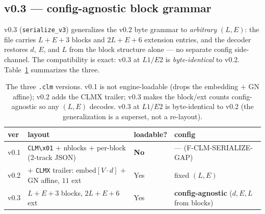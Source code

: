 \subsection{v0.3 --- config-agnostic block grammar}
\label{app:clm-v03}

v0.3 (\texttt{serialize\_v3}) generalizes the v0.2 byte grammar to \emph{arbitrary}
$(L,E)$: the file carries $L+E+3$ blocks and $2L+E+6$ extension entries, and the
decoder restores $d$, $E$, and $L$ from the block structure alone --- no separate
config side-channel. The compatibility is exact: v0.3 at $L1/E2$ is
\emph{byte-identical} to v0.2. Table~\ref{tab:clm-versions} summarizes the three.

\begin{table}[h]
\centering
\small
\setlength{\tabcolsep}{6pt}
\begin{tabular}{@{}l l l l@{}}
\toprule
\textbf{ver} & \textbf{layout} & \textbf{loadable?} & \textbf{config} \\
\midrule
v0.1 & \texttt{CLM\textbackslash x01} $+$ nblocks $+$ per-block (2-track JSON) & \textbf{No} & --- (F-CLM-SERIALIZE-GAP) \\
v0.2 & $+$ \texttt{CLMX} trailer: embed$[V{\cdot}d]$ $+$ GN affine, $11$ ext & Yes & fixed $(L,E)$ \\
v0.3 & $L{+}E{+}3$ blocks, $2L{+}E{+}6$ ext & Yes & \textbf{config-agnostic} ($d,E,L$ from blocks) \\
\bottomrule
\end{tabular}
\caption{The three \texttt{.clm} versions. v0.1 is not engine-loadable (drops the
embedding $+$ GN affine); v0.2 adds the CLMX trailer; v0.3 makes the block/ext
counts config-agnostic so any $(L,E)$ decodes. v0.3 at $L1/E2$ is byte-identical
to v0.2 (the generalization is a superset, not a re-layout).}
\label{tab:clm-versions}
\end{table}


